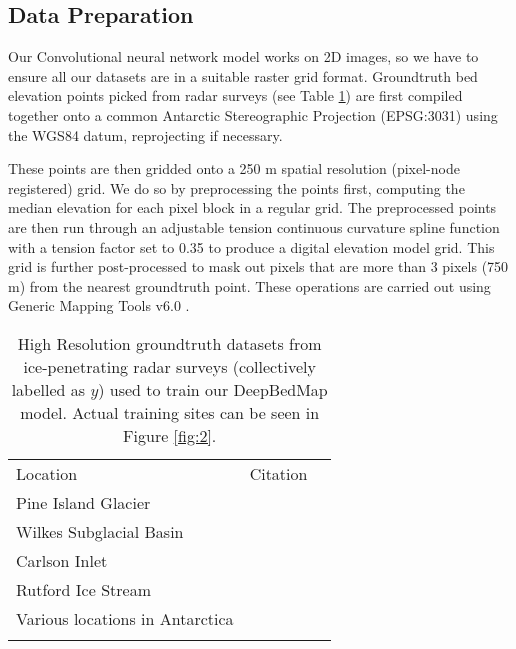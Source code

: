 \documentclass[tc, manuscript]{copernicus}
\begin{document}
\subsection{Data Preparation}

Our Convolutional neural network model works on 2D images, so we have to ensure all our datasets are in a suitable raster grid format.
Groundtruth bed elevation points picked from radar surveys (see Table \ref{table:groundtruthdata}) are first compiled together onto a common Antarctic Stereographic Projection (EPSG:3031) using the WGS84 datum, reprojecting if necessary.

These points are then gridded onto a 250 m spatial resolution (pixel-node registered) grid.
We do so by preprocessing the points first, computing the median elevation for each pixel block in a regular grid.
The preprocessed points are then run through an adjustable tension continuous curvature spline function with a tension factor set to 0.35 to produce a digital elevation model grid.
This grid is further post-processed to mask out pixels that are more than 3 pixels (750 m) from the nearest groundtruth point.
These operations are carried out using Generic Mapping Tools v6.0 \citep[GMT6,][]{WesselGenericMappingTools2019}.

\begin{table}[ht]
  \caption{
    High Resolution groundtruth datasets from ice-penetrating radar surveys (collectively labelled as $y$) used to train our DeepBedMap model.
    Actual training sites can be seen in Figure \ref{fig:2}.
  }
  \label{table:groundtruthdata}
  \begin{tabular}{lcr}
  \tophline
  Location & Citation \\
  \middlehline
  Pine Island Glacier & \cite{BinghamDiverselandscapesPine2017} \\
  Wilkes Subglacial Basin & \cite{JordanHypothesismegaoutburstflooding2010} \\
  Carlson Inlet & \cite{KingIcestreamnot2011} \\
  Rutford Ice Stream & \cite{KingSubglaciallandformsRutford2016} \\
  Various locations in Antarctica & \cite{ShiMultichannelCoherentRadar2010} \\
  \bottomhline
  \end{tabular}
  \belowtable{} %
\end{table}
\end{document}
